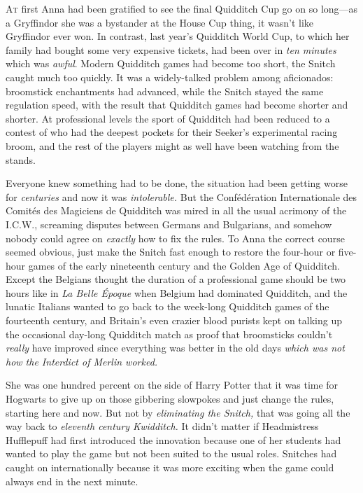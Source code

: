 
\lettrine{A}{t} first Anna had
been gratified to see the final Quidditch Cup go on so long—as a Gryffindor
she was a bystander at the House Cup thing, it wasn’t like Gryffindor ever won.
In contrast, last year’s Quidditch World Cup, to which her family had bought
some very expensive tickets, had been over in \emph{ten minutes} which was
\emph{awful}. Modern Quidditch games had become too short, the Snitch caught
much too quickly. It was a widely-talked problem among aficionados: broomstick
enchantments had advanced, while the Snitch stayed the same regulation speed,
with the result that Quidditch games had become shorter and shorter. At
professional levels the sport of Quidditch had been reduced to a contest of who
had the deepest pockets for their Seeker’s experimental racing broom, and the
rest of the players might as well have been watching from the stands.

Everyone knew something had to be done, the situation had been getting worse
for \emph{centuries} and now it was \emph{intolerable.} But the Confédération
Internationale des Comités des Magiciens de Quidditch was mired in all the usual
acrimony of the I.C.W., screaming disputes between Germans and Bulgarians, and
somehow nobody could agree on \emph{exactly} how to fix the rules. To Anna the
correct course seemed obvious, just make the Snitch fast enough to restore the
four-hour or five-hour games of the early nineteenth century and the Golden Age
of Quidditch. Except the Belgians thought the duration of a professional game
should be two hours like in \emph{La Belle Époque} when Belgium had dominated
Quidditch, and the lunatic Italians wanted to go back to the week-long
Quidditch games of the fourteenth century, and Britain’s even crazier blood
purists kept on talking up the occasional day-long Quidditch match as proof
that broomsticks couldn’t \emph{really} have improved since everything was
better in the old days \emph{which was not how the Interdict of Merlin worked.}

She was one hundred percent on the side of Harry Potter that it was time for
Hogwarts to give up on those gibbering slowpokes and just change the rules,
starting here and now. But not by \emph{eliminating the Snitch,} that was going
all the way back to \emph{eleventh century Kwidditch.} It didn’t matter if
Headmistress Hufflepuff had first introduced the innovation because one of her
students had wanted to play the game but not been suited to the usual roles.
Snitches had caught on internationally because it was more exciting when the
game could always end in the next minute.

